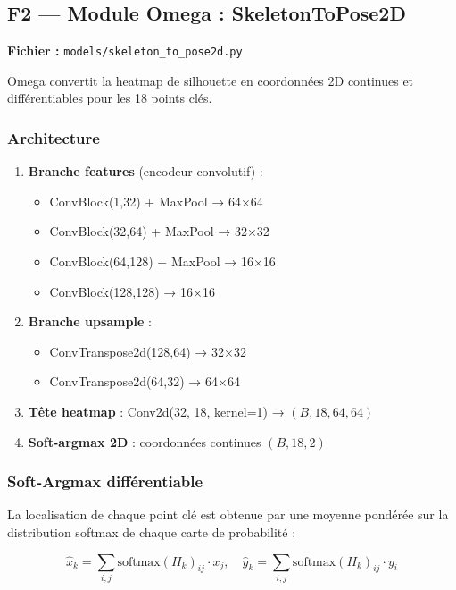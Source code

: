 \documentclass[12pt,a4paper]{article}
\begin{document}
\subsection{F2 --- Module Omega : SkeletonToPose2D}
\label{sec:omega}

\textbf{Fichier :} \texttt{models/skeleton\_to\_pose2d.py}

Omega convertit la heatmap de silhouette en coordonnées 2D continues et
différentiables pour les 18 points clés.

\subsubsection*{Architecture}

\begin{enumerate}
  \item \textbf{Branche features} (encodeur convolutif) :
  \begin{itemize}
    \item ConvBlock(1,32) + MaxPool → 64×64
    \item ConvBlock(32,64) + MaxPool → 32×32
    \item ConvBlock(64,128) + MaxPool → 16×16
    \item ConvBlock(128,128) → 16×16
  \end{itemize}
  \item \textbf{Branche upsample} :
  \begin{itemize}
    \item ConvTranspose2d(128,64) → 32×32
    \item ConvTranspose2d(64,32) → 64×64
  \end{itemize}
  \item \textbf{Tête heatmap} : Conv2d(32, 18, kernel=1) → $(B, 18, 64, 64)$
  \item \textbf{Soft-argmax 2D} : coordonnées continues $(B, 18, 2)$
\end{enumerate}

\subsubsection*{Soft-Argmax différentiable}

La localisation de chaque point clé est obtenue par une moyenne pondérée sur la
distribution softmax de chaque carte de probabilité :

\begin{equation}
  \hat{x}_k = \sum_{i,j} \text{softmax}(H_k)_{ij} \cdot x_j, \quad
  \hat{y}_k = \sum_{i,j} \text{softmax}(H_k)_{ij} \cdot y_i
\end{equation}
\end{document}
